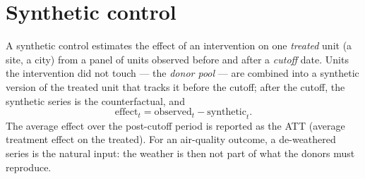 \documentclass[11pt]{report}
\begin{document}
\section{Synthetic control}\label{sec:scmtheory}
A synthetic control estimates the effect of an intervention on one \emph{treated} unit
(a site, a city) from a panel of units observed before and after a \emph{cutoff} date.
Units the intervention did not touch --- the \emph{donor pool} --- are combined into a
synthetic version of the treated unit that tracks it before the cutoff; after the cutoff,
the synthetic series is the counterfactual, and
\begin{equation}
  \text{effect}_t = \text{observed}_t - \text{synthetic}_t .
\end{equation}
The average effect over the post-cutoff period is reported as the ATT (average treatment
effect on the treated). For an air-quality outcome, a de-weathered series is the natural
input: the weather is then not part of what the donors must reproduce.
\end{document}
